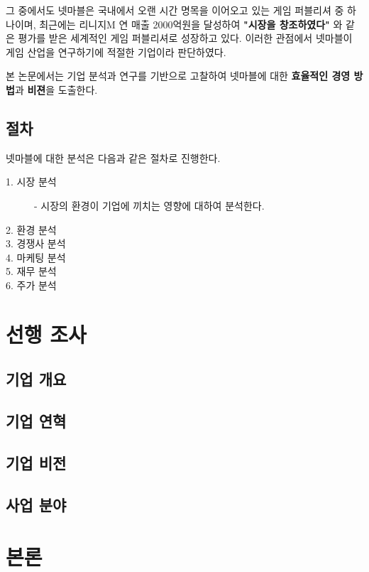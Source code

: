 \documentclass{oblivoir}
\begin{document}
			그 중에서도 넷마블은 국내에서 오랜 시간 명목을 이어오고 있는 게임 퍼블리셔 중 하나이며, 최근에는 리니지M 연 매출 2000억원을 달성하여 \textbf{"시장을 창조하였다"} 와 같은 평가를 받은 세계적인 게임 퍼블리셔로 성장하고 있다.
			이러한 관점에서 넷마블이 게임 산업을 연구하기에 적절한 기업이라 판단하였다.
			
			본 논문에서는 기업 분석과 연구를 기반으로 고찰하여 넷마블에 대한 \textbf{효율적인 경영 방법}과 \textbf{비젼}을 도출한다. 
			
		\subsection{절차}
			넷마블에 대한 분석은 다음과 같은 절차로 진행한다.
			
			\begin{description}
			\item[1. 시장 분석] - 시장의 환경이 기업에 끼치는 영향에 대하여 분석한다.
			\item[2. 환경 분석]
			\item[3. 경쟁사 분석]
			\item[4. 마케팅 분석]
			\item[5. 재무 분석]
			\item[6. 주가 분석] 
			\end{description}
	
	\section{선행 조사}
		\subsection{기업 개요}
		
		\subsection{기업 연혁}
		
		\subsection{기업 비전}
		
		\subsection{사업 분야}
	
	\section{본론}
\end{document}
